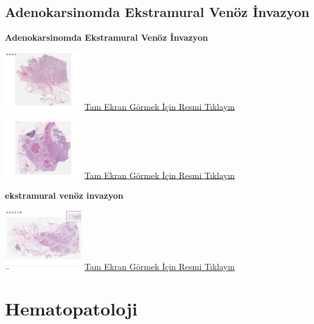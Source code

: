 \documentclass[
  letterpaper,
  DIV=11,
  numbers=noendperiod]{scrreprt}
\begin{document}
\hypertarget{sec-adenokarsinomda-ekstramural-venoz-invazyon}{%
\chapter{Adenokarsinomda Ekstramural Venöz
İnvazyon}\label{sec-adenokarsinomda-ekstramural-venoz-invazyon}}

\textbf{Adenokarsinomda Ekstramural Venöz İnvazyon}

\href{https://images.patolojiatlasi.com/extramuralvenousinvasion/HE.html}{\includegraphics[width=0.25\textwidth,height=\textheight]{./screenshots/thumbnail_extramuralvenousinvasion.png}}
\href{https://images.patolojiatlasi.com/extramuralvenousinvasion/HE.html}{Tam
Ekran Görmek İçin Resmi Tıklayın}

\href{https://images.patolojiatlasi.com/extramuralvenousinvasion/HE2.html}{\includegraphics[width=0.25\textwidth,height=\textheight]{./screenshots/thumbnail_extramuralvenousinvasion-2.png}}
\href{https://images.patolojiatlasi.com/extramuralvenousinvasion/HE2.html}{Tam
Ekran Görmek İçin Resmi Tıklayın}

\textbf{ekstramural venöz invazyon}

\href{https://images.patolojiatlasi.com/extramural-venous-invasion/HE.html}{\includegraphics[width=0.25\textwidth,height=\textheight]{./screenshots/thumbnail_extramural-venous-invasion.png}}
\href{https://images.patolojiatlasi.com/extramural-venous-invasion/HE.html}{Tam
Ekran Görmek İçin Resmi Tıklayın}

\part{Hematopatoloji}
\end{document}
